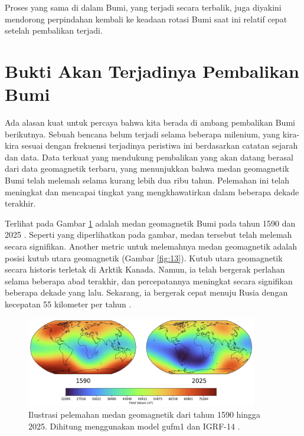 \documentclass[10pt,twocolumn,letterpaper]{article}
\begin{document}
Proses yang sama di dalam Bumi, yang terjadi secara terbalik, juga diyakini mendorong perpindahan kembali ke keadaan rotasi Bumi saat ini relatif cepat setelah pembalikan terjadi.

\section{Bukti Akan Terjadinya Pembalikan Bumi}

Ada alasan kuat untuk percaya bahwa kita berada di ambang pembalikan Bumi berikutnya. Sebuah bencana belum terjadi selama beberapa milenium, yang kira-kira sesuai dengan frekuensi terjadinya peristiwa ini berdasarkan catatan sejarah dan data. Data terkuat yang mendukung pembalikan yang akan datang berasal dari data geomagnetik terbaru, yang menunjukkan bahwa medan geomagnetik Bumi telah melemah selama kurang lebih dua ribu tahun. Pelemahan ini telah meningkat dan mencapai tingkat yang mengkhawatirkan dalam beberapa dekade terakhir.

Terlihat pada Gambar \ref{fig:14} adalah medan geomagnetik Bumi pada tahun 1590 dan 2025 \cite{125,126}. Seperti yang diperlihatkan pada gambar, medan tersebut telah melemah secara signifikan.
Another metric untuk melemahnya medan geomagnetik adalah posisi kutub utara geomagnetik (Gambar \ref{fig:13}). Kutub utara geomagnetik secara historis terletak di Arktik Kanada. Namun, ia telah bergerak perlahan selama beberapa abad terakhir, dan percepatannya meningkat secara signifikan beberapa dekade yang lalu. Sekarang, ia bergerak cepat menuju Rusia dengan kecepatan 55 kilometer per tahun \cite{124}.

\begin{figure}[t]
\begin{center}
\includegraphics[width=0.9\textwidth]{saa.jpg}
\end{center}
   \caption{Ilustrasi pelemahan medan geomagnetik dari tahun 1590 hingga 2025. Dihitung menggunakan model gufm1 dan IGRF-14 \cite{125,126}.}
\label{fig:14}
\end{figure}
\end{document}
